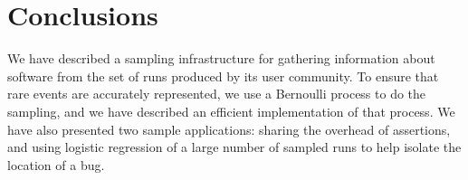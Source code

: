 \section{Conclusions}
\label{sec:conclusions}

We have described a sampling infrastructure for gathering information
about software from the set of runs produced by its user community.
To ensure that rare events are accurately represented, we use a
Bernoulli process to do the sampling, and we have described an
efficient implementation of that process.  We have also presented two
sample applications: sharing the overhead of assertions, and using
logistic regression of a large number of sampled runs to help isolate
the location of a bug.

